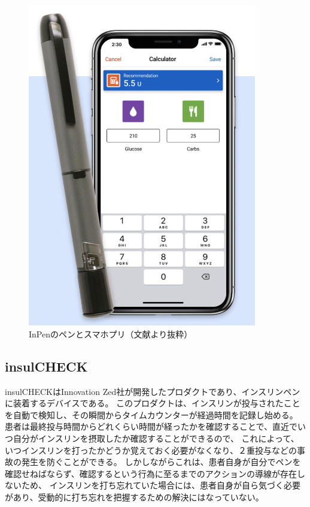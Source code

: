 \begin{figure}[htbp]
  \caption{InPenのペンとスマホプリ（文献\cite{inpen}より抜粋）}
  \label{fig:inpen_display}
  \begin{center}
    \includegraphics[bb=0 0 1000 500,width=10cm]{assets/inpen_display.png}
  \end{center}
\end{figure}

\subsection{insulCHECK}

insulCHECKはInnovation Zed社が開発したプロダクトであり、インスリンペンに装着するデバイスである。
このプロダクトは、インスリンが投与されたことを自動で検知し、その瞬間からタイムカウンターが経過時間を記録し始める。
患者は最終投与時間からどれくらい時間が経ったかを確認することで、直近でいつ自分がインスリンを摂取したか確認することができるので、
これによって、いつインスリンを打ったかどうか覚えておく必要がなくなり、２重投与などの事故の発生を防ぐことができる。
しかしながらこれは、患者自身が自分でペンを確認せねばならず、確認するという行為に至るまでのアクションの導線が存在しないため、
インスリンを打ち忘れていた場合には、患者自身が自ら気づく必要があり、受動的に打ち忘れを把握するための解決にはなっていない。

